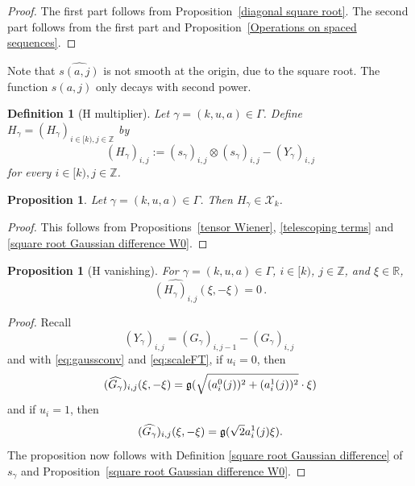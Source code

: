 \documentclass[12pt,reqno]{amsart}
\theoremstyle{plain}
\newtheorem{proposition}[theorem]{Proposition}
\newtheorem{definition}[theorem]{Definition}
\numberwithin{equation}{section}
\theoremstyle{remark}
\newcommand{\using}[1]{}
\newcommand{\Z}{{\mathbb Z}}
\newcommand{\R}{{\mathbb R}}
\begin{document}
\begin{proof}
The first part follows from Proposition~\ref{diagonal square root}. The second part follows from the first part and Proposition~\ref{Operations on spaced sequences}.
\end{proof}

Note that $\widehat{s(a,j)}$ is not smooth at the origin, due to the square root. The function $s(a,j)$ only decays with second power.


\begin{definition}[H multiplier]\label{H multiplier}
Let $\gamma=(k,u,a)\in \Gamma$. Define
    $H_{\gamma}=(H_\gamma)_{i\in [k),j\in \Z}$ by
\begin{equation}\label{auto:H-kernel-definition}
(H_{\gamma})_{i,j}:=(s_{\gamma})_{i,j}\otimes (s_{\gamma})_{i,j}
  -(Y_{\gamma})_{i,j}
\end{equation}
for every $i\in [k), j\in\mathbb{Z}$.
\end{definition}

\begin{proposition}\label{H-in-X}\using{tensor Wiener}\using{telescoping terms}\using{square root Gaussian difference W0}
Let $\gamma=(k,u,a)\in \Gamma$. Then $H_{\gamma}\in \mathcal{X}_k$.
\end{proposition}
\begin{proof}
This follows from Propositions~\ref{tensor Wiener}, \ref{telescoping terms} and \ref{square root Gaussian difference W0}.
\end{proof}


\begin{proposition}[H vanishing]\label{H vanishing}\using{Elementary Gaussian properties}\using{square root Gaussian difference W0}
    For $\gamma=(k,u,a)\in \Gamma$, $i\in [k)$, $j\in \Z$, and $\xi\in \R$,
\begin{equation}\label{auto:H-kernel-diagonal-cancellation-Fourier}
    \widehat{(H_{\gamma})_{i,j}}(\xi,-\xi)=0\, .
\end{equation}
\end{proposition}

\begin{proof}
Recall
\[ (Y_\gamma)_{i,j} = (G_\gamma)_{i,j-1} - (G_\gamma)_{i,j}\ \]
and with \eqref{eq:gaussconv} and \eqref{eq:scaleFT}, if $u_i=0$, then
\[ (\widehat{G_\gamma})_{i,j}(\xi, -\xi) = \mathfrak{g}(\sqrt{(a_{i}^0(j))^2 + (a_{i}^1(j))^2}\cdot \xi) \]
and if $u_i=1$, then
\[ (\widehat{G_\gamma})_{i,j}(\xi, -\xi) = \mathfrak{g}(\sqrt{2} a_{i}^1(j) \xi).\]
The proposition now follows with Definition \ref{square root Gaussian difference} of $s_\gamma$ and Proposition~\ref{square root Gaussian difference W0}.
\end{proof}
\end{document}
